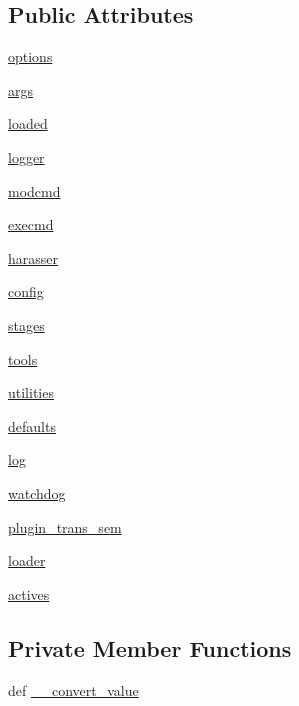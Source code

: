 \subsection*{Public Attributes}
\begin{DoxyCompactItemize}
\item 
\hyperlink{classTestDef_1_1TestDef_a7c7d587995154a9f31607dc4726d3a2a}{options}
\item 
\hyperlink{classTestDef_1_1TestDef_a30e459036991de30822f267f1d882d44}{args}
\item 
\hyperlink{classTestDef_1_1TestDef_a21764cc1b70626946a708b7a0f003b38}{loaded}
\item 
\hyperlink{classTestDef_1_1TestDef_a2ec3a5ec20bb6ba539d68c3c5a40ca5d}{logger}
\item 
\hyperlink{classTestDef_1_1TestDef_af6c1e9ceaf9d8e747bbb57af3bd33198}{modcmd}
\item 
\hyperlink{classTestDef_1_1TestDef_aa3ffe5befea4becaad6a8c5f13446039}{execmd}
\item 
\hyperlink{classTestDef_1_1TestDef_a1dc633e4dd69542c5eb07e880d7ea401}{harasser}
\item 
\hyperlink{classTestDef_1_1TestDef_a85a2e1fffeda060f750494dd4082594d}{config}
\item 
\hyperlink{classTestDef_1_1TestDef_a9e15c13bd0cc9b1567c94f847118432e}{stages}
\item 
\hyperlink{classTestDef_1_1TestDef_a2414cc1583555b0c758e0f9f0952a787}{tools}
\item 
\hyperlink{classTestDef_1_1TestDef_a0b9ea6f06c02401ad62e06c4cfd80bd2}{utilities}
\item 
\hyperlink{classTestDef_1_1TestDef_a96d72418702f22844fc2fd5d774c7291}{defaults}
\item 
\hyperlink{classTestDef_1_1TestDef_a50bbc74a64733e7dbec613bbfe3a519d}{log}
\item 
\hyperlink{classTestDef_1_1TestDef_a40da46aa95507cffa798cb152fa69e27}{watchdog}
\item 
\hyperlink{classTestDef_1_1TestDef_ac4a745e8b2151d1eed56e04770562eb9}{plugin\-\_\-trans\-\_\-sem}
\item 
\hyperlink{classTestDef_1_1TestDef_a07a19e8ffafc926b0732d466a837b13b}{loader}
\item 
\hyperlink{classTestDef_1_1TestDef_a1eb766274fa9869e6b04e612e6d169b0}{actives}
\end{DoxyCompactItemize}
\subsection*{Private Member Functions}
\begin{DoxyCompactItemize}
\item 
def \hyperlink{classTestDef_1_1TestDef_a2ed090ffdc5882b9855a22a6ec408185}{\-\_\-\-\_\-convert\-\_\-value}
\end{DoxyCompactItemize}


